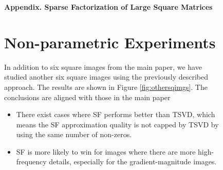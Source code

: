 \documentclass{article}
\begin{document}
\begin{figure}[t]
\begin{center}
\clearpage
\begin{center}
\textbf{\large Appendix. Sparse Factorization of Large Square Matrices}
\end{center}
\setcounter{equation}{0}
\setcounter{figure}{0}
\setcounter{table}{0}
\setcounter{page}{1}
\setcounter{section}{0}
\makeatletter
\renewcommand{\theequation}{A\arabic{equation}}
\renewcommand{\thefigure}{A\arabic{figure}}
\renewcommand{\thetable}{A\arabic{table}}



\section{Non-parametric Experiments}
In addition to six square images from the main paper, we have studied another six square images using the previously described approach. The results are shown in Figure \ref{fig:othersqimgs}. The conclusions are aligned with those in the main paper
\begin{itemize}
    \item There exist cases where SF performs better than TSVD, which means the SF approximation quality is not capped by TSVD by using the same number of non-zeros.
    \item SF is more likely to win for images where there are more high-frequency details, especially for the gradient-magnitude images.
\end{itemize}
\label{appendix:non-param}



\end{center}
\end{figure}
\end{document}
